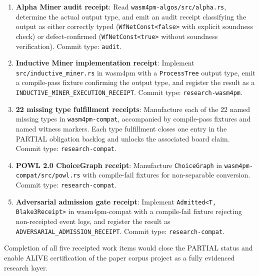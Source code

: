 \begin{enumerate}
  \item \textbf{Alpha Miner audit receipt}: Read \texttt{wasm4pm-algos/src/alpha.rs},
    determine the actual output type, and emit an audit receipt classifying the
    output as either correctly typed (\texttt{WfNetConst<false>} with explicit
    soundness check) or defect-confirmed (\texttt{WfNetConst<true>} without
    soundness verification). Commit type: \texttt{audit}.

  \item \textbf{Inductive Miner implementation receipt}: Implement
    \texttt{src/inductive\_miner.rs} in wasm4pm with a \texttt{ProcessTree}
    output type, emit a compile-pass fixture confirming the output type, and
    register the result as a \texttt{INDUCTIVE\_MINER\_EXECUTION\_RECEIPT}.
    Commit type: \texttt{research-wasm4pm}.

  \item \textbf{22 missing type fulfillment receipts}: Manufacture each of
    the 22 named missing types in \texttt{wasm4pm-compat}, accompanied by
    compile-pass fixtures and named witness markers. Each type fulfillment
    closes one entry in the PARTIAL obligation backlog and unlocks the
    associated board claim. Commit type: \texttt{research-compat}.

  \item \textbf{POWL 2.0 ChoiceGraph receipt}: Manufacture \texttt{ChoiceGraph}
    in \texttt{wasm4pm-compat/src/powl.rs} with compile-fail fixtures for
    non-separable conversion. Commit type: \texttt{research-compat}.

  \item \textbf{Adversarial admission gate receipt}: Implement
    \texttt{Admitted<T, Blake3Receipt>} in wasm4pm-compat with a compile-fail
    fixture rejecting non-receipted event logs, and register the result as
    \texttt{ADVERSARIAL\_ADMISSION\_RECEIPT}. Commit type:
    \texttt{research-compat}.
\end{enumerate}

Completion of all five receipted work items would close the PARTIAL status and
enable ALIVE certification of the paper corpus project as a fully evidenced
research layer.
